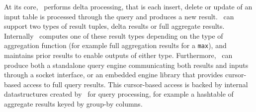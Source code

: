 {At its core, \compiler\ performs delta processing, that is each insert, delete or
update of an input table is processed through the query and produces a new
result. \compiler\ can support two types of result tuples, delta results or full
aggregate results. Internally \compiler\ computes one of these result types
depending on the type of aggregation function (for example full aggregation
results for a \texttt{max}), and maintains prior results to enable outputs of
either type. Furthermore, \compiler\ can produce both a standalone query engine
communicating both results and inputs through a socket interface, or an embedded
engine library that provides cursor-based access to full query results. This
cursor-based access is backed by internal datastructures created by \compiler\
for query processing, for example a hashtable of aggregate results keyed by
group-by columns.
}


